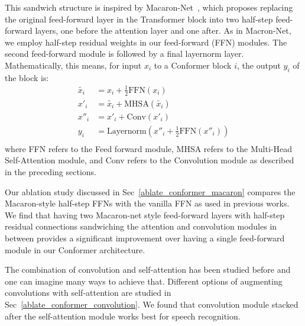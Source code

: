 This sandwich structure is inspired by Macaron-Net~\cite{lu2019understanding}, which proposes  replacing the original feed-forward layer in the Transformer block into two half-step feed-forward layers, one before the attention layer and one after.  
As in Macron-Net, we employ half-step residual weights in our feed-forward (FFN) modules. The second feed-forward module is followed by a final layernorm layer.
Mathematically, this means, for input $x_{i}$ to a Conformer block $i$, the output $y_{i}$ of the block is:
\begin{equation}
\begin{split}
    \tilde{x_{i}}&= x_{i} + \frac{1}{2}\mathrm{FFN}(x_{i})    \\
    x'_{i}&= \tilde{x_{i}} + \mathrm{MHSA}(\tilde{x_{i}})    \\
    x''_{i}&= x'_{i} + \mathrm{Conv}(x'_{i})    \\
    y_{i}&= \mathrm{Layernorm}(x''_{i} + \frac{1}{2}\mathrm{FFN}(x''_{i}))    \\
\end{split}
\label{model:conformer:equation}
\end{equation}
where FFN refers to the Feed forward module, MHSA refers to the Multi-Head Self-Attention module, and Conv refers to the Convolution module as described in the preceding sections.

Our ablation study discussed in Sec~\ref{ablate_conformer_macaron} compares the Macaron-style half-step FFNs with the vanilla FFN as used in previous works. We find that having two Macaron-net style feed-forward layers with half-step residual connections sandwiching the attention and convolution modules in between provides a significant improvement over having a single feed-forward module in our Conformer architecture.

The combination of convolution and self-attention has been studied before and one can imagine many ways to achieve that. 
Different options of augmenting convolutions with self-attention are studied in Sec~\ref{ablate_conformer_convolution}.
We found that convolution module stacked after the self-attention module works best for speech recognition.